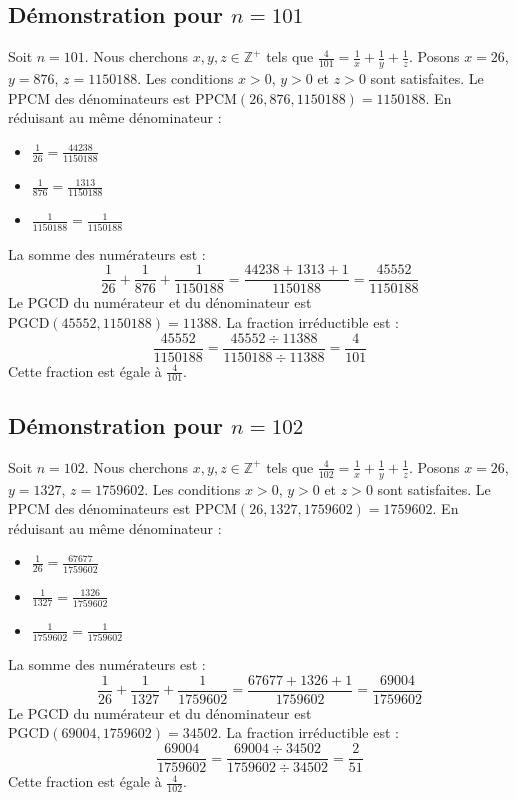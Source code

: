 \documentclass[11pt,a4paper]{article}
\begin{document}
\subsection{Démonstration pour $n = 101$}
Soit $n = 101$. Nous cherchons $x, y, z \in \mathbb{Z}^{+}$ tels que $\frac{4}{101} = \frac{1}{x} + \frac{1}{y} + \frac{1}{z}$.
Posons $x = 26$, $y = 876$, $z = 1150188$.
Les conditions $x > 0$, $y > 0$ et $z > 0$ sont satisfaites.
Le PPCM des dénominateurs est $\text{PPCM}(26, 876, 1150188) = 1150188$.
En réduisant au même dénominateur :
\begin{itemize}
    \item $\frac{1}{26} = \frac{44238}{1150188}$
    \item $\frac{1}{876} = \frac{1313}{1150188}$
    \item $\frac{1}{1150188} = \frac{1}{1150188}$
\end{itemize}
La somme des numérateurs est :
$$ \frac{1}{26} + \frac{1}{876} + \frac{1}{1150188} = \frac{44238 + 1313 + 1}{1150188} = \frac{45552}{1150188} $$
Le PGCD du numérateur et du dénominateur est $\text{PGCD}(45552, 1150188) = 11388$.
La fraction irréductible est :
$$ \frac{45552}{1150188} = \frac{45552 \div 11388}{1150188 \div 11388} = \frac{4}{101} $$
Cette fraction est égale à $\frac{4}{101}$.

\subsection{Démonstration pour $n = 102$}
Soit $n = 102$. Nous cherchons $x, y, z \in \mathbb{Z}^{+}$ tels que $\frac{4}{102} = \frac{1}{x} + \frac{1}{y} + \frac{1}{z}$.
Posons $x = 26$, $y = 1327$, $z = 1759602$.
Les conditions $x > 0$, $y > 0$ et $z > 0$ sont satisfaites.
Le PPCM des dénominateurs est $\text{PPCM}(26, 1327, 1759602) = 1759602$.
En réduisant au même dénominateur :
\begin{itemize}
    \item $\frac{1}{26} = \frac{67677}{1759602}$
    \item $\frac{1}{1327} = \frac{1326}{1759602}$
    \item $\frac{1}{1759602} = \frac{1}{1759602}$
\end{itemize}
La somme des numérateurs est :
$$ \frac{1}{26} + \frac{1}{1327} + \frac{1}{1759602} = \frac{67677 + 1326 + 1}{1759602} = \frac{69004}{1759602} $$
Le PGCD du numérateur et du dénominateur est $\text{PGCD}(69004, 1759602) = 34502$.
La fraction irréductible est :
$$ \frac{69004}{1759602} = \frac{69004 \div 34502}{1759602 \div 34502} = \frac{2}{51} $$
Cette fraction est égale à $\frac{4}{102}$.
\end{document}
